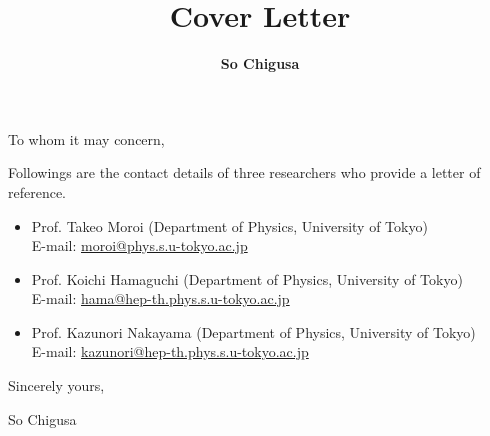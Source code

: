 \documentclass[12pt,notitlepage]{article}
\title{\vspace*{-3cm}Cover Letter}
\author{\textbf{So Chigusa}}
\date{}
\begin{document}
\thispagestyle{empty}

To whom it may concern,

\vspace{5mm}
Followings are the contact details of three researchers who provide a letter of reference.
\begin{itemize}
  \setlength{\parskip}{1mm}
  \setlength{\itemsep}{0cm}
  \item
    Prof. Takeo Moroi (Department of Physics, University of Tokyo)\\
    E-mail: \href{mailto:moroi@phys.s.u-tokyo.ac.jp}{moroi@phys.s.u-tokyo.ac.jp}

  \item
    Prof. Koichi Hamaguchi (Department of Physics, University of Tokyo)\\
    E-mail: \href{mailto:hama@hep-th.phys.s.u-tokyo.ac.jp}{hama@hep-th.phys.s.u-tokyo.ac.jp}

  \item
    Prof. Kazunori Nakayama (Department of Physics, University of Tokyo)\\
    E-mail: \href{mailto:kazunori@hep-th.phys.s.u-tokyo.ac.jp}{kazunori@hep-th.phys.s.u-tokyo.ac.jp}

\end{itemize}

\vspace{5mm}
Sincerely yours,

\vspace{5mm}
So Chigusa
\end{document}
